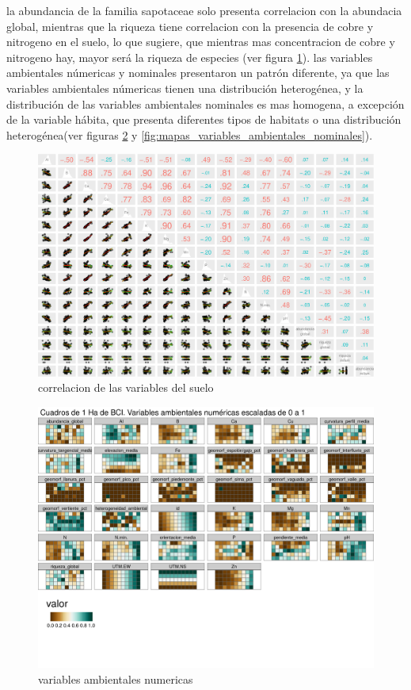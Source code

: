 \documentclass[11pt,]{article}
\begin{document}
la abundancia de la familia sapotaceae solo presenta correlacion con la
abundacia global, mientras que la riqueza tiene correlacion con la
presencia de cobre y nitrogeno en el suelo, lo que sugiere, que mientras
mas concentracion de cobre y nitrogeno hay, mayor será la riqueza de
especies (ver figura \ref{fig:p_cor_suelo_ar}). las variables
ambientales númericas y nominales presentaron un patrón diferente, ya
que las variables ambientales númericas tienen una distribución
heterogénea, y la distribución de las variables ambientales nominales es
mas homogena, a excepción de la variable hábita, que presenta diferentes
tipos de habitats o una distribución heterogénea(ver figuras
\ref{fig:mapas_variables_ambientales_numericas} y
\ref{fig:mapas_variables_ambientales_nominales}).

\begin{figure}
\centering
\includegraphics{manuscrito_files/figure-latex/unnamed-chunk-4-1.pdf}
\caption{\label{fig:p_cor_suelo_ar}correlacion de las variables del
suelo}
\end{figure}

\begin{figure}
\centering
\includegraphics[width=1.00000\textwidth]{mapas_variables_ambientales_numericas_tmap.png}
\caption{variables ambientales
numericas\label{fig:mapas_variables_ambientales_numericas}}
\end{figure}
\end{document}
